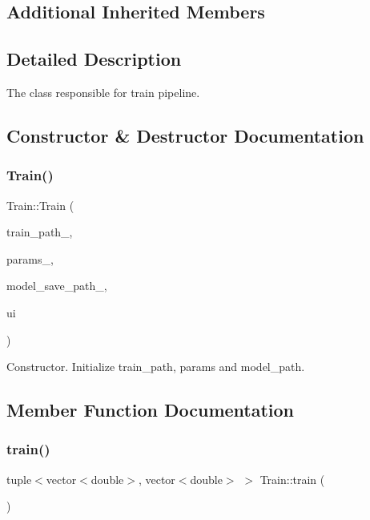 \subsection*{Additional Inherited Members}


\subsection{Detailed Description}
The class responsible for train pipeline. 

\subsection{Constructor \& Destructor Documentation}
\mbox{\label{class_train_a4b75a671b226dea5fb805ae78861bf57}} 
\subsubsection{\texorpdfstring{Train()}{Train()}}
{\footnotesize\ttfamily Train\+::\+Train (\begin{DoxyParamCaption}\item[{string}]{train\+\_\+path\+\_\+,  }\item[{const \hyperlink{struct_train_parameters}{Train\+Parameters} \&}]{params\+\_\+,  }\item[{string}]{model\+\_\+save\+\_\+path\+\_\+,  }\item[{\hyperlink{class_ui___train___window}{Ui\+\_\+\+Train\+\_\+\+Window} $\ast$}]{ui }\end{DoxyParamCaption})\hspace{0.3cm}{\ttfamily [explicit]}}

Constructor. Initialize train\+\_\+path, params and model\+\_\+path. 

\subsection{Member Function Documentation}
\mbox{\label{class_train_a259b2edda87fb6b17adfb71527a2de94}} 
\subsubsection{\texorpdfstring{train()}{train()}}
{\footnotesize\ttfamily tuple$<$vector$<$double$>$, vector$<$double$>$ $>$ Train\+::train (\begin{DoxyParamCaption}{ }\end{DoxyParamCaption})\hspace{0.3cm}{\ttfamily [virtual]}}

